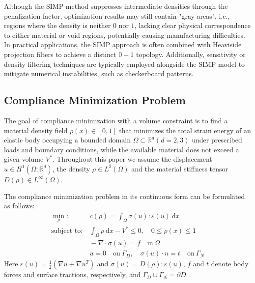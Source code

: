 \documentclass[mathpazo]{cicp}
\begin{document}
Although the SIMP method suppresses intermediate densities through the penalization factor, optimization results may still contain "gray areas", i.e., regions where the density is neither $0$ nor $1$, lacking clear physical correspondence to either material or void regions, potentially causing manufacturing difficulties. In practical applications, the SIMP approach is often combined with Heaviside projection filters to achieve a distinct $0-1$ topology. Additionally, sensitivity or density filtering techniques are typically employed alongside the SIMP model to mitigate numerical instabilities, such as checkerboard patterns.

\subsection{Compliance Minimization Problem}
The goal of compliance minimization with a volume constraint is to find a material density field $\rho(x)\in[0,1]$ that minimizes the total strain energy of an elastic body occupying a bounded domain $\Omega\subset\mathbb{R}^d(d=2,3)$ under prescribed loads and boundary conditions, while the available material does not exceed a given volume $V^*$. Throughout this paper we assume the displacement $u\in{H}^1(\Omega;\mathbb{R}^d)$, the density $\rho\in{L}^2(\Omega)$ and the material stiffness tensor $D(\rho)\in{L}^{\infty}(\Omega)$.

The compliance minimization problem in its continuous form can be formulated as follows:
\begin{equation}\label{eq:cmpc}
	\begin{aligned}
		\min_{\rho}:
		&~c(\rho) = \int_{\Omega}\sigma(u):\varepsilon(u)~\text{d}x  \\
		\text{subject~to}:
		&~\int_\Omega\rho~\text{d}x - V^*\leq0,\quad0\leq\rho(x)\leq1\\
		&~-\nabla\cdot\sigma(u) = f\quad\text{in}~\Omega\\
		&~u=0\quad\text{on}~\Gamma_D,\quad\sigma(u)\cdot{n}=t\quad\text{on}~\Gamma_N
	\end{aligned}
\end{equation}
Here $\varepsilon(u) = \frac{1}{2}(\nabla{u}+\nabla{u}^T)$ and $\sigma(u) = D(\rho):\varepsilon(u)$, $f$ and $t$ denote body forces and surface tractions, respectively, and $\Gamma_D \cup \Gamma_N = \partial{D}$.
\end{document}
